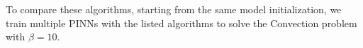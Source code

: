 \documentclass[letterpaper]{article} %
\begin{document}


            
           To compare these algorithms, starting from the same model initialization, we train multiple PINNs with the listed algorithms to solve the Convection problem with $\beta=10$. %
\end{document}
